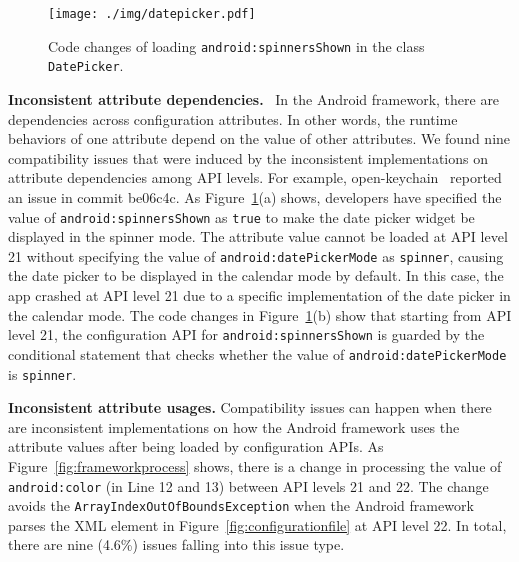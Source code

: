 \begin{figure}[t]
	\centering
	\texttt{[image: ./img/datepicker.pdf]}
	\caption{Code changes of loading \texttt{android:spinnersShown} in the class \texttt{DatePicker}.}
	\label{fig:datepicker}
\end{figure}
\textbf{Inconsistent attribute dependencies.}~
In the Android framework, there are dependencies across configuration attributes.
In other words, the runtime behaviors of one attribute depend on the value of other attributes.
We found nine compatibility issues that were induced by the inconsistent implementations on attribute dependencies among API levels. %
For example, open-keychain~\cite{openkeychain} reported an issue in commit be06c4c.
As Figure~\ref{fig:datepicker}(a) shows, developers have specified the value of \texttt{android:spinnersShown} as \texttt{true} to make the date picker widget be displayed in the spinner mode.
The attribute value cannot be loaded at API level 21 without specifying the value of \texttt{android:datePickerMode} as \texttt{spinner}, causing the date picker to be displayed in the calendar mode by default.
In this case, the app crashed at API level 21 due to a specific implementation of the date picker in the calendar mode.
The code changes in Figure~\ref{fig:datepicker}(b) show that starting from API level 21, the configuration API for \texttt{android:spinnersShown} is guarded by the conditional statement that checks whether the value of \texttt{android:datePickerMode} is \texttt{spinner}.

\textbf{Inconsistent attribute usages.}
Compatibility issues can happen when there are inconsistent implementations on how the Android framework uses the attribute values after being loaded by configuration APIs.
As Figure~\ref{fig:frameworkprocess} shows, there is a change in processing the value of \texttt{android:color} (in Line 12 and 13) between API levels 21 and 22. The change avoids the \texttt{ArrayIndexOutOfBoundsException} when the Android framework parses the XML element in Figure~\ref{fig:configurationfile} at API level 22.
In total, there are nine (4.6\%) issues falling into this issue type.


